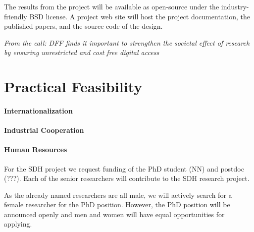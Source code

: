 \documentclass[fleqn,12pt]{article}
\begin{document}
The results from the project will be available as open-source under the
industry-friendly BSD license.
A project web site will host the project documentation, the published papers, and the
source code of the design.

\emph{From the call: DFF finds it important to strengthen the societal effect of research by ensuring unrestricted and cost free digital access}



\section{Practical Feasibility}


\paragraph*{Internationalization}



\paragraph*{Industrial Cooperation}



\paragraph*{Human Resources}

For the SDH project we
request funding of the PhD student (NN) and postdoc (???).
Each of the senior researchers will contribute to the SDH research project.


As the already named researchers are all male, we will actively search
for a female researcher for the PhD position.
However, the PhD position will be announced openly and men and women
will have equal opportunities for applying.
\end{document}
